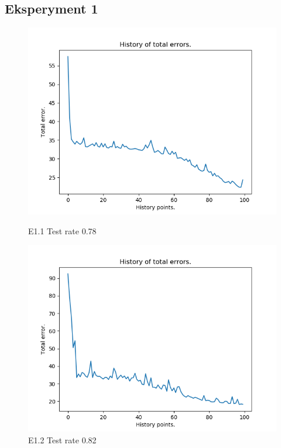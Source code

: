 \documentclass{classrep}
\begin{document}
\subsection{Eksperyment 1}
		\begin{figure}[H]
			\begin{minipage}{0.5\linewidth}
				\centering
				\includegraphics[scale=0.25]{iris_nn_s2.png}
				\caption{E1.1 Test rate  0.78}
			\end{minipage}
			\begin{minipage}{0.5\linewidth}
				\centering
				\includegraphics[scale=0.25]{iris_nn_s7.png}
				\caption{E1.2 Test rate  0.82}
				\label{E1.2}
			\end{minipage}
			\begin{minipage}{0.5\linewidth}

\end{minipage}
\end{figure}
\end{document}

